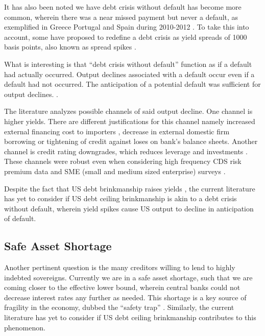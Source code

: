 \documentclass[
  12pt]{article}
\begin{document}
It has also been noted we have debt crisis without default has become
more common, wherein there was a near missed payment but never a
default, as exemplified in Greece Portugal and Spain during 2010-2012
\citep{mitchener2023}. To take this into account, some have proposed to
redefine a debt crisis as yield spreads of 1000 basis points, also known
as spread spikes \citep{broner2013, aguiar, krishnamurthy}.

What is interesting is that ``debt crisis without default'' function as
if a default had actually occurred. Output declines associated with a
default occur even if a default had not occurred. The anticipation of a
potential default was sufficient for output declines.
\citep{yeyati2011}.

The literature analyzes possible channels of said output decline. One
channel is higher yields. There are different justifications for this
channel namely increased external financing cost to importers
\citep{mendoza2012}, decrease in external domestic firm
borrowing\citep{corsetti2012, das2010, gourinchas2016} or tightening of
credit against loses on bank's balance
sheets\citep{arellano, ferrando2017}. Another channel is credit rating
downgrades, which reduces leverage and investments \citep{almeida2017}.
These channels were robust even when considering high frequency CDS risk
premium data and SME (small and medium sized enterprise) surveys
\citep{brutti2015, bahaj2020, almeida2017}.

Despite the fact that US debt brinkmanship raises yields
\citep{nippani2017}, the current literature has yet to consider if US
debt ceiling brinkmanship is akin to a debt crisis without default,
wherein yield spikes cause US output to decline in anticipation of
default.

\hypertarget{safe-asset-shortage}{%
\subsection{Safe Asset Shortage}\label{safe-asset-shortage}}

Another pertinent question is the many creditors willing to lend to
highly indebted sovereigns. Currently we are in a safe asset shortage,
such that we are coming closer to the effective lower bound, wherein
central banks could not decrease interest rates any further as needed.
This shortage is a key source of fragility in the economy, dubbed the
``safety trap'' \citep{caballero2017} . Similarly, the current
literature has yet to consider if US debt ceiling brinkmanship
contributes to this phenomenon.
\end{document}

